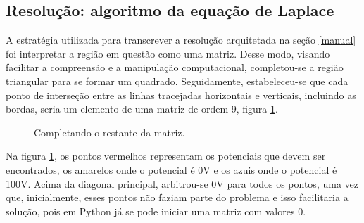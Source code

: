 \documentclass[a4paper,11pt]{article}
\begin{document}
\pagebreak

\subsection{Resolução: algoritmo da equação de Laplace \label{laplace}}
    A estratégia utilizada para transcrever a resolução arquitetada na seção \ref{manual} foi interpretar a região em questão como uma matriz. Desse modo, visando facilitar a compreensão e a manipulação computacional, completou-se a região triangular para se formar um quadrado. Seguidamente, estabeleceu-se que cada ponto de interseção entre as linhas tracejadas horizontais e verticais, incluindo as bordas, seria um elemento de uma matriz de ordem 9, figura \ref{matriz}.
    
    \begin{figure}[H]
        \centering
        \caption[width=\columnwidth]{Completando o restante da matriz.}
        \label{matriz}
    \end{figure}
    
    Na figura \ref{matriz}, os pontos vermelhos representam os potenciais que devem ser encontrados, os amarelos onde o potencial é 0V e os azuis onde o potencial é 100V. Acima da diagonal principal, arbitrou-se 0V para todos os pontos, uma vez que, inicialmente, esses pontos não faziam parte do problema e isso facilitaria a solução, pois em Python já se pode iniciar uma matriz com valores 0.
    
\end{document}
